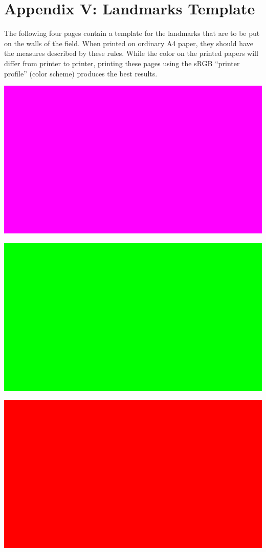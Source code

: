 \documentclass{article}
\begin{document}
\section{Appendix V: Landmarks Template\label{ref-066}}

The following four pages contain a template for the landmarks that are to be put on the walls of the field. When printed on ordinary A4 paper, they should have the measures described by these rules. While the color on the printed papers will differ from printer to printer, printing these pages using the sRGB ``printer profile'' (color scheme) produces the best results.

\includegraphics[width=1\textwidth]{media/image11.png}

\includegraphics[width=1\textwidth]{media/image12.png}

\includegraphics[width=1\textwidth]{media/image13.png}
\end{document}
